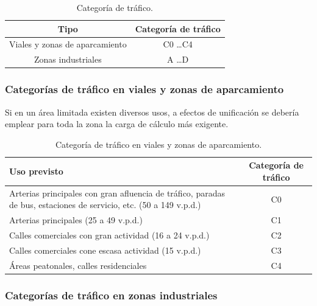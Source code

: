 \begin{table}[!htb]
\centering
\begin{tabular}{cc}
\toprule
Tipo & Categoría de tráfico\\
\midrule
Viales y zonas de aparcamiento & C0 \ldots C4\\
Zonas industriales & A \ldots D\\
\bottomrule
\end{tabular}
\caption{Categoría de tráfico.}
\label{categoriadetrafico}
\end{table}

\subsubsection{Categorías de tráfico en viales y zonas de aparcamiento}

Si en un área limitada existen diversos usos, a efectos de unificación se debería emplear para toda la zona la carga de cálculo más exigente.

\begin{table}[!htb]
\centering
\begin{tabular}{p{7cm}c}
\toprule
Uso previsto & Categoría de tráfico\\
\midrule
Arterias principales con gran afluencia de tráfico, paradas de bus, estaciones de servicio, etc. (50 a 149 v.p.d.) & C0\\
Arterias principales (25 a 49 v.p.d.) & C1\\
Calles comerciales con gran actividad (16 a 24 v.p.d.) & C2\\
Calles comerciales cone escasa actividad (15 v.p.d.) & C3\\
Áreas peatonales, calles residenciales & C4\\
\bottomrule
\end{tabular}
\caption{Categoría de tráfico en viales y zonas de aparcamiento.}
\label{categoriadetraficoenviales}
\end{table}


\subsubsection{Categorías de tráfico en zonas industriales}

